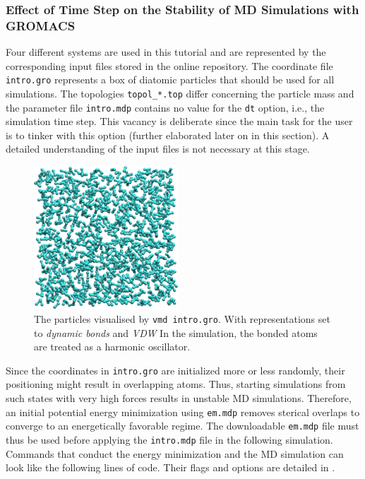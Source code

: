 \documentclass[9pt,tutorial]{livecoms}
\newcommand{\code}[1]{\colorbox{light-gray}{\texttt{#1}}}
\begin{document}
\subsubsection*{Effect of Time Step on the Stability of MD Simulations with GROMACS}
Four different systems are used in this tutorial and are represented by the corresponding input files stored in the online repository. The coordinate file \code{intro.gro} represents a box of diatomic particles that should be used for all simulations. The topologies \code{topol\_*.top} differ concerning the particle mass and the parameter file \code{intro.mdp} contains no value for the \code{dt} option, i.e., the simulation time step. This vacancy is deliberate since the main task for the user is to tinker with this option (further elaborated later on in this section). A detailed understanding of the input files is not necessary at this stage.
\begin{figure}
    \centering
    \includegraphics[width=0.48\textwidth]{figures/ArbitraryDiatomixParticlesBox.png}
    \caption{The particles visualised by \code{vmd intro.gro}. With representations set to \textit{dynamic bonds} and \textit{VDW} In the simulation, the bonded atoms are treated as a harmonic oscillator.}
    \label{fig:ArbitraryDiatomixParticlesBox}
\end{figure}
Since the coordinates in \code{intro.gro} are initialized more or less randomly, their positioning might result in overlapping atoms. Thus, starting simulations from such states with very high forces results in unstable MD simulations. Therefore, an initial potential energy minimization using \texttt{em.mdp} removes sterical overlaps to converge to an energetically favorable regime. The downloadable \code{em.mdp} file must thus be used before applying the \code{intro.mdp} file in the following simulation. Commands that conduct the energy minimization and the MD simulation can look like the following lines of code. Their flags and options are detailed in .
\end{document}
